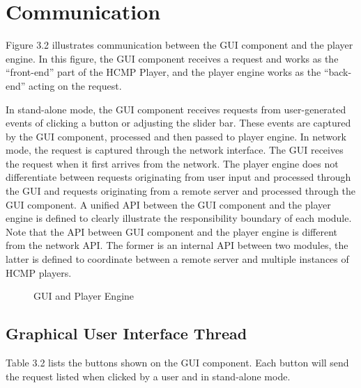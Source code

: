 \section{Communication}

Figure 3.2 illustrates communication between the GUI component and the player 
engine. In this figure, the GUI component receives a request and works as the 
``front-end'' part of the HCMP Player, and the player engine works as the 
``back-end'' acting on the request. 

In stand-alone mode, the GUI component 
receives requests from user-generated events of clicking a button or adjusting 
the slider bar. These events are captured by the GUI component, processed and 
then passed to player engine. In network mode, the request is captured through 
the network interface. The GUI receives the request when it first arrives 
from the network. The player engine does not differentiate between requests 
originating from user input and processed through the GUI and requests 
originating from a remote server and processed through the GUI component. 
A unified API between the GUI component and the player engine is defined to
clearly illustrate the responsibility boundary of each module. Note that the 
API between GUI component and the player engine is different from the network API. 
The former is an internal API between two modules, the latter is defined to 
coordinate between a remote server and multiple instances of HCMP players.

\begin{figure}[H]
\caption{GUI and Player Engine}
\end{figure}

\subsection{Graphical User Interface Thread}

Table 3.2 lists the buttons shown on the GUI component. Each button will send
the request listed when clicked by a user and in stand-alone mode.

